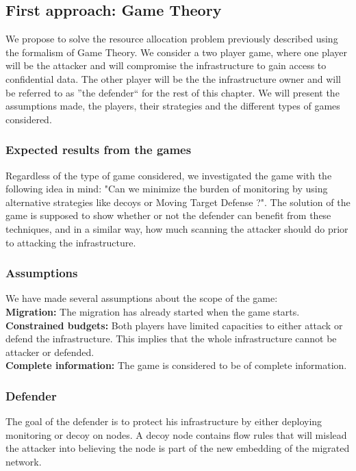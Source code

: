 \subsection{First approach: Game Theory}

We propose to solve the resource allocation problem previously described using the formalism of Game Theory.
We consider a two player game, where one player will be the attacker and will compromise the infrastructure to gain access to confidential data. The other player will be the the infrastructure owner and will be referred to as ''the defender`` for the rest of this chapter.
We will present the assumptions made, the players, their strategies and the different types of games considered.

\subsubsection{Expected results from the games}
Regardless of the type of game considered, we investigated the game with the following idea in mind: "Can we minimize the burden of monitoring by using alternative strategies like decoys or Moving Target Defense ?".
The solution of the game is supposed to show whether or not the defender can benefit from these techniques, and in a similar way, how much scanning the attacker should do prior to attacking the infrastructure.



\subsubsection{Assumptions}
We have made several assumptions about the scope of the game:\\
\textbf{Migration: } The migration has already started when the game starts.\\
\textbf{Constrained budgets: } Both players have limited capacities to either attack or defend the infrastructure.
This implies that the whole infrastructure cannot be attacker or defended.\\
\textbf{Complete information: } The game is considered to be of complete information.\\


\subsubsection{Defender}
The goal of the defender is to protect his infrastructure by either deploying monitoring or decoy on nodes. A decoy node contains flow rules that will mislead the attacker into believing the node is part of the new embedding of the migrated network.

